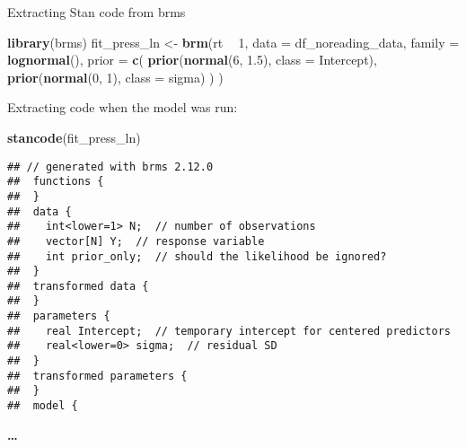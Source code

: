\documentclass[12pt,ignorenonframetext,aspectratio=169]{beamer}
\newenvironment{Shaded}{\begin{snugshade}}{\end{snugshade}}
\newcommand{\DataTypeTok}[1]{\textcolor[rgb]{0.13,0.29,0.53}{#1}}
\newcommand{\DecValTok}[1]{\textcolor[rgb]{0.00,0.00,0.81}{#1}}
\newcommand{\FloatTok}[1]{\textcolor[rgb]{0.00,0.00,0.81}{#1}}
\newcommand{\KeywordTok}[1]{\textcolor[rgb]{0.13,0.29,0.53}{\textbf{#1}}}
\newcommand{\NormalTok}[1]{#1}
\newcommand{\OperatorTok}[1]{\textcolor[rgb]{0.81,0.36,0.00}{\textbf{#1}}}
\newcommand{\StringTok}[1]{\textcolor[rgb]{0.31,0.60,0.02}{#1}}
\begin{document}
\begin{frame}[fragile]{Extracting Stan code from brms}
\protect\hypertarget{extracting-stan-code-from-brms}{}

\scriptsize

\begin{Shaded}
\begin{Highlighting}[]
\KeywordTok{library}\NormalTok{(brms)}
\NormalTok{fit_press_ln <-}\StringTok{ }\KeywordTok{brm}\NormalTok{(rt }\OperatorTok{~}\StringTok{ }\DecValTok{1}\NormalTok{,}
  \DataTypeTok{data =}\NormalTok{ df_noreading_data,}
  \DataTypeTok{family =} \KeywordTok{lognormal}\NormalTok{(),}
  \DataTypeTok{prior =} \KeywordTok{c}\NormalTok{(}
    \KeywordTok{prior}\NormalTok{(}\KeywordTok{normal}\NormalTok{(}\DecValTok{6}\NormalTok{, }\FloatTok{1.5}\NormalTok{), }\DataTypeTok{class =}\NormalTok{ Intercept),}
    \KeywordTok{prior}\NormalTok{(}\KeywordTok{normal}\NormalTok{(}\DecValTok{0}\NormalTok{, }\DecValTok{1}\NormalTok{), }\DataTypeTok{class =}\NormalTok{ sigma)}
\NormalTok{  )}
\NormalTok{)}
\end{Highlighting}
\end{Shaded}

\normalsize

\end{frame}

\begin{frame}[fragile]

\begin{block}{Extracting code when the model was run:}

\vspace{1cm}

\small

\begin{Shaded}
\begin{Highlighting}[]
\KeywordTok{stancode}\NormalTok{(fit_press_ln)}
\end{Highlighting}
\end{Shaded}

\normalsize

\end{block}

\end{frame}

\begin{frame}[fragile]

\scriptsize

\begin{verbatim}
## // generated with brms 2.12.0 
##  functions { 
##  } 
##  data { 
##    int<lower=1> N;  // number of observations 
##    vector[N] Y;  // response variable 
##    int prior_only;  // should the likelihood be ignored? 
##  } 
##  transformed data { 
##  } 
##  parameters { 
##    real Intercept;  // temporary intercept for centered predictors 
##    real<lower=0> sigma;  // residual SD 
##  } 
##  transformed parameters { 
##  } 
##  model {
\end{verbatim}

\normalsize

\textbf{\ldots{}}

\end{frame}
\end{document}
